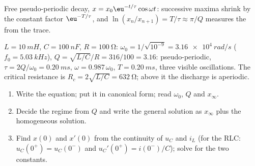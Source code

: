 \begin{omfigure}

{\small Free pseudo-periodic decay, $x = x_0\eu^{-t/\tau}\cos\omega t$:
successive maxima shrink by the constant factor $\eu^{-T/\tau}$, and
$\ln(x_n/x_{n+1}) = T/\tau \approx \pi/Q$ measures the 
from the trace.}
\end{omfigure}

\begin{example}\label{ex:b1:transient-regimes:rlcnum}
$L = \qty{10}{mH}$, $C = \qty{100}{nF}$, $R = \qty{100}{\ohm}$:
$\omega_0 = 1/\sqrt{10^{-9}} = \qty{3.16e4}{rad/s}$ ($f_0 =
\qty{5.03}{kHz}$), $Q = \sqrt{L/C}/R = 316/100 = 3.16$: pseudo-periodic,
$\tau = 2Q/\omega_0 = \qty{0.20}{ms}$, $\omega = 0.987\,\omega_0$,
$T = \qty{0.20}{ms}$, three visible oscillations. The critical resistance
is $R_c = 2\sqrt{L/C} = \qty{632}{\ohm}$; above it the discharge is
aperiodic.
\end{example}

\begin{method}\label{met:b1:transient-regimes:second}
\begin{enumerate}
  \item Write the equation; put it in canonical form; read $\omega_0$,
        $Q$ and $x_\infty$.
  \item Decide the regime from $Q$ and write the general solution as
        $x_\infty$ plus the homogeneous solution.
  \item Find $x(0)$ and $x'(0)$ from the continuity of $u_C$ and $i_L$
        (for the RLC: $u_C(0^+) = u_C(0^-)$ and $u_C'(0^+) = i(0^-)/C$);
        solve for the two constants.
\end{enumerate}
\end{method}

